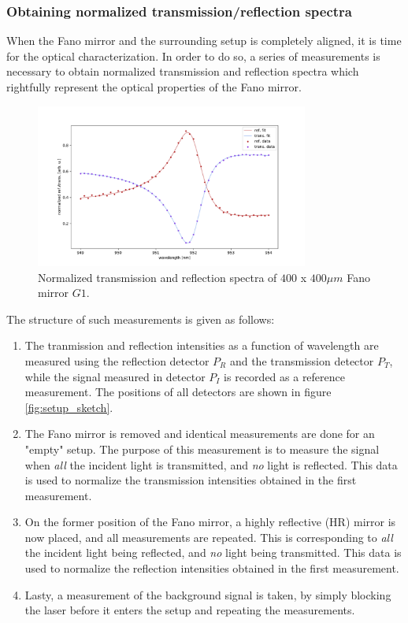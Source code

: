 \subsubsection{Obtaining normalized transmission/reflection spectra}

When the Fano mirror and the surrounding setup is completely aligned, it is time for the optical characterization. In order to do so, a series of measurements is necessary to obtain normalized transmission and reflection spectra which rightfully represent the optical properties of the Fano mirror. 

\begin{figure}[h!]
    \centering
    \includegraphics[width=0.8\textwidth]{figures/norm_ref_and_trans_M3.pdf}
    \caption{Normalized transmission and reflection spectra of $400$ x $400 \mu m$ Fano mirror $G1$.}
    \label{fig:normalized_ref_trans_spectra}
\end{figure}

The structure of such measurements is given as follows: 
\begin{enumerate}
    \item The tranmission and reflection intensities as a function of wavelength are measured using the reflection detector $P_R$ and the transmission detector $P_T$, while the signal measured in detector $P_I$ is recorded as a reference measurement. The positions of all detectors are shown in figure \ref{fig:setup_sketch}. 
    \item The Fano mirror is removed and identical measurements are done for an "empty" setup. The purpose of this measurement is to measure the signal when \emph{all} the incident light is transmitted, and \emph{no} light is reflected. This data is used to normalize the transmission intensities obtained in the first measurement. 
    \item On the former position of the Fano mirror, a highly reflective (HR) mirror is now placed, and all measurements are repeated. This is corresponding to \emph{all} the incident light being reflected, and \emph{no} light being transmitted. This data is used to normalize the reflection intensities obtained in the first measurement.
    \item Lasty, a measurement of the background signal is taken, by simply blocking the laser before it enters the setup and repeating the measurements. 
\end{enumerate}

